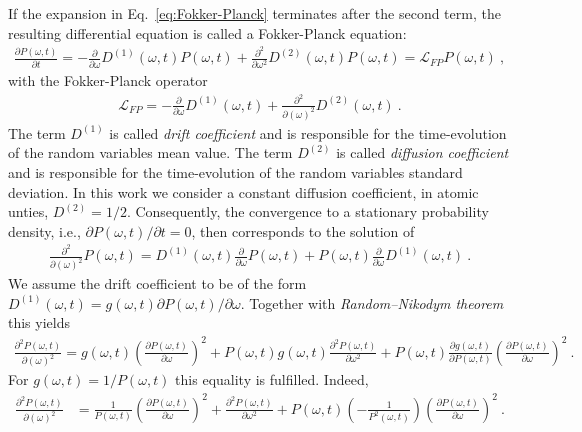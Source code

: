 \documentclass[11pt,a4paper]{article}
\numberwithin{equation}{section}
\begin{document}
If the expansion in Eq.~\eqref{eq:Fokker-Planck} terminates after the second term, the resulting differential equation is called a Fokker-Planck equation:
\begin{align*}
\frac{\partial P(\omega,t)}{\partial t}
=
-\frac{\partial}{\partial \omega}D^{(1)}(\omega,t)P(\omega,t)
+
\frac{\partial^2}{\partial \omega^2}D^{(2)}(\omega,t)P(\omega,t)
=
\mathcal{L}_{FP} P(\omega,t)~,
\end{align*}
with the Fokker-Planck operator
\begin{align*}
\mathcal{L}_{FP}
=
-\frac{\partial}{\partial \omega}D^{(1)}(\omega,t)
+
\frac{\partial^2}{\partial (\omega)^2}D^{(2)}(\omega,t)~.
\end{align*}
The term $D^{(1)}$ is called {\it drift coefficient} and is responsible for the time-evolution of the random variables mean value. 
%
The term $D^{(2)}$ is called {\it diffusion coefficient} and is responsible for the time-evolution of the random variables standard deviation.
%
In this work we consider a constant diffusion coefficient, in atomic unties, $D^{(2)}=1/2$. 
%
Consequently, the convergence to a stationary probability density, i.e., ${\partial P(\omega,t)}/{\partial t}=0$, then corresponds to the solution of
\begin{align*}
\frac{\partial^2}{\partial (\omega)^2}P(\omega,t)
=
D^{(1)}(\omega,t)\frac{\partial}{\partial \omega}P(\omega,t)
+
P(\omega,t)\frac{\partial}{\partial \omega}D^{(1)}(\omega,t)~.
\end{align*}
We assume the drift coefficient to be of the form $D^{(1)}(\omega,t) = g(\omega,t)\partial P(\omega,t)/\partial \omega$. 
%
Together with {\it Random--Nikodym theorem} this yields
\begin{align*}
\frac{\partial^2P(\omega,t)}{\partial (\omega)^2}
=
g(\omega,t)\left(\frac{\partial P(\omega,t)}{\partial \omega}\right)^2
+
P(\omega,t)g(\omega,t) \frac{\partial^2 P(\omega,t)}{\partial \omega^2}
+
P(\omega,t)\frac{\partial g(\omega,t)}{\partial P(\omega,t)}\left(\frac{\partial P(\omega,t)}{\partial \omega}\right)^2~.
\end{align*}
For $g(\omega,t)=1/P(\omega,t)$ this equality is fulfilled.
%
Indeed,
\begin{align*}
\frac{\partial^2P(\omega,t)}{\partial (\omega)^2}
&=
\frac{1}{P(\omega,t)}\left(\frac{\partial P(\omega,t)}{\partial \omega}\right)^2
+
\frac{\partial^2 P(\omega,t)}{\partial \omega^2}
+
P(\omega,t)\left(-\frac{1}{P^2(\omega,t)}
\right)\left(\frac{\partial P(\omega,t)}{\partial \omega}\right)^2~.
\end{align*}
\end{document}
